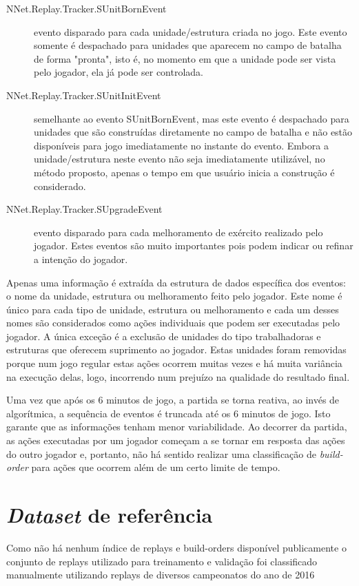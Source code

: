 \begin{description}
	\item[NNet.Replay.Tracker.SUnitBornEvent] evento disparado para cada \gls{unidade}/\gls{estrutura} criada no jogo. Este evento somente é despachado para \glspl{unidade} que aparecem no campo de batalha de forma "pronta"\cite{s2protocol}, isto é, no momento em que a \gls{unidade} pode ser vista pelo jogador, ela já pode ser controlada.
	\item[NNet.Replay.Tracker.SUnitInitEvent] semelhante ao evento SUnitBornEvent, mas este evento é despachado para \glspl{unidade} que são construídas diretamente no campo de batalha e não estão disponíveis para jogo imediatamente no instante do evento\cite{s2protocol}. Embora a \gls{unidade}/\gls{estrutura} neste evento não seja imediatamente utilizável, no método proposto, apenas o tempo em que usuário inicia a construção é considerado.
	\item[NNet.Replay.Tracker.SUpgradeEvent] evento disparado para cada \gls{melhoramento} de exército realizado pelo jogador. Estes eventos são muito importantes pois podem indicar ou refinar a intenção do jogador.
\end{description}

Apenas uma informação é extraída da \gls{estrutura} de dados específica dos eventos: o nome da \gls{unidade}, \gls{estrutura} ou \gls{melhoramento} feito pelo jogador. Este nome é único para cada tipo de \gls{unidade}, \gls{estrutura} ou \gls{melhoramento} e cada um desses nomes são considerados como ações individuais que podem ser executadas pelo jogador. A única exceção é a exclusão de \glspl{unidade} do tipo trabalhadoras e \glspl{estrutura} que oferecem suprimento ao jogador. Estas \glspl{unidade} foram removidas porque num jogo regular estas ações ocorrem muitas vezes e há muita variância na execução delas, logo, incorrendo num prejuízo na qualidade do resultado final.

Uma vez que após os 6 minutos de jogo, a partida se torna reativa, ao invés de algorítmica, a sequência de eventos é truncada até os 6 minutos de jogo. Isto garante que as informações tenham menor variabilidade. Ao decorrer da partida, as ações executadas por um jogador começam a se tornar em resposta das ações do outro jogador e, portanto, não há sentido realizar uma classificação de \textit{\gls{build-order}} para ações que ocorrem além de um certo limite de tempo.

		\section{\textit{Dataset} de referência}
Como não há nenhum índice de \glspl{replay} e \glspl{build-order} disponível publicamente o conjunto de \glspl{replay} utilizado para treinamento e validação foi classificado manualmente utilizando \glspl{replay} de diversos campeonatos do ano de 2016

